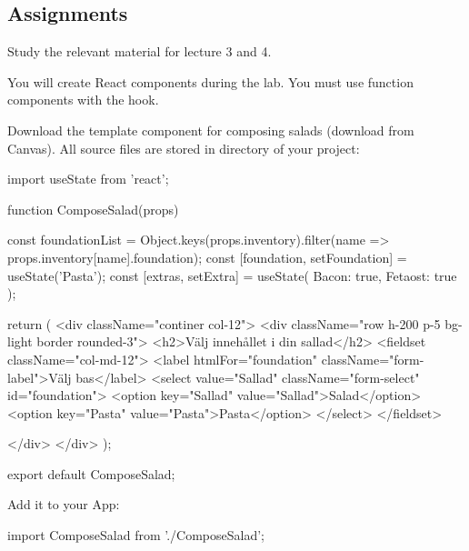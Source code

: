 \documentclass[fleqn, article, a4paper]{memoir}
\begin{document}
\subsection*{Assignments}

\begin{Assignments}

\item Study the relevant material for lecture 3 and 4.

\item You will create React components during the lab. You must use function components with the  hook.

\item Download the template component for composing salads (download from Canvas). All source files are stored in  directory of your project:
\begin{Code}
import { useState } from 'react';

function ComposeSalad(props) {
  const foundationList = Object.keys(props.inventory).filter(name => props.inventory[name].foundation);
  const [foundation, setFoundation] = useState('Pasta');
  const [extras, setExtra] = useState({ Bacon: true, Fetaost: true });

  return (
    <div className="continer col-12">
      <div className="row h-200 p-5 bg-light border rounded-3">
        <h2>Välj innehållet i din sallad</h2>
        <fieldset className="col-md-12">
          <label htmlFor="foundation" className="form-label">Välj bas</label>
          <select value="Sallad" className="form-select" id="foundation">
            <option key="Sallad" value="Sallad">Salad</option>
            <option key="Pasta" value="Pasta">Pasta</option>
          </select>
        </fieldset>

      </div>
    </div>
  );
}
export default ComposeSalad;
\end{Code}

\noindent Add it to your App:
\begin{Code}
import ComposeSalad from './ComposeSalad';


\end{Code}
\end{Assignments}
\end{document}
